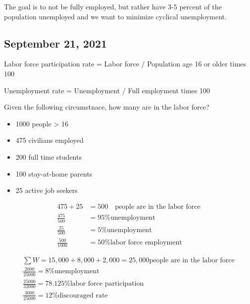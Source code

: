 \documentclass{scrreprt} %
\begin{document}
\begin{remark}
	The goal is to not be fully employed, but rather have 3-5 percent of the population
	unemployed and we want to minimize cyclical unemployment.
\end{remark}

\subsection{September 21, 2021}

\begin{definition}
	Labor force participation rate = Labor force / Population age 16 or older times 100

	Unemployment rate = Unemployment / Full employment times 100
\end{definition}

\begin{example}
	Given the following circumstnace, how many are in the labor force?

	\begin{itemize}
		\item 1000 people > 16
		\item 475 civilians employed
		\item 200 full time students
		\item 100 stay-at-home parents
		\item 25 active job seekers
	\end{itemize}

	\begin{align*}
		475 + 25 &= 500 \quad \text{people are in the labor force} \\
		\frac{475}{500} &= 95 \text{\% unemployment} \\
		\frac{25}{500} &= 5 \text{\% unemployment} \\
		\frac{500}{1000} &= 50 \text{\% labor force employment}
	\end{align*}

	\begin{align*}
		\sum W = 15,000 + 8,000 + 2,000 = 25,000 \text{people are in the labor force} \\
		\frac{2000}{25000} = 8 \text{\% unemployment} \\
		\frac{25000}{32000} = 78.125 \text{\% labor force participation} \\
		\frac{3000}{25000} = 12 \text{\% discouraged rate}
	\end{align*}
\end{example}
\end{document}
